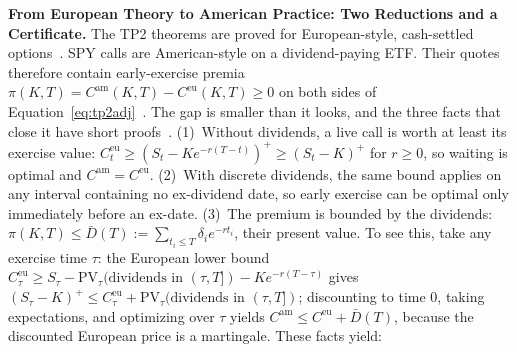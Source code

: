 \documentclass[sigconf,review,anonymous]{acmart}
\begin{document}
\medskip\noindent\textbf{From European Theory to American Practice: Two Reductions and a Certificate.}
\label{sec:american}
The TP2 theorems are proved for European-style, cash-settled options~\cite{glasserman2026tp2theory}. SPY calls are American-style on a dividend-paying ETF. Their quotes therefore contain early-exercise premia $\pi(K,T)=C^{\mathrm{am}}(K,T)-C^{\mathrm{eu}}(K,T)\ge0$ on both sides of Equation~\eqref{eq:tp2adj}~\cite{cosma2020earlyexercise}. The gap is smaller than it looks, and the three facts that close it have short proofs~\cite{merton1973,black1975}. (1)~Without dividends, a live call is worth at least its exercise value: $C^{\mathrm{eu}}_t\ge(S_t-Ke^{-r(T-t)})^+\ge(S_t-K)^+$ for $r\ge0$, so waiting is optimal and $C^{\mathrm{am}}=C^{\mathrm{eu}}$. (2)~With discrete dividends, the same bound applies on any interval containing no ex-dividend date, so early exercise can be optimal only immediately before an ex-date. (3)~The premium is bounded by the dividends: $\pi(K,T)\le\bar D(T):=\sum_{t_i\le T}\delta_i e^{-rt_i}$, their present value. To see this, take any exercise time $\tau$: the European lower bound $C^{\mathrm{eu}}_\tau\ge S_\tau-\mathrm{PV}_\tau(\text{dividends in }(\tau,T])-Ke^{-r(T-\tau)}$ gives $(S_\tau-K)^+\le C^{\mathrm{eu}}_\tau+\mathrm{PV}_\tau(\text{dividends in }(\tau,T])$; discounting to time 0, taking expectations, and optimizing over $\tau$ yields $C^{\mathrm{am}}\le C^{\mathrm{eu}}+\bar D(T)$, because the discounted European price is a martingale. These facts yield:
\end{document}
